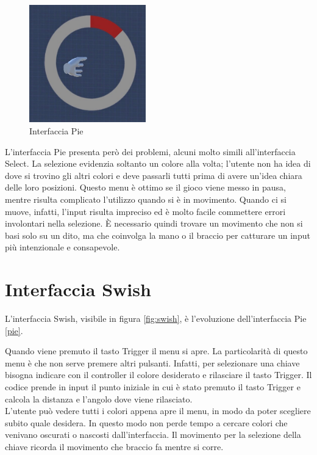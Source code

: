 \documentclass[target=bach,aauheader=]{thud}
\begin{document}
\begin{figure}[h]
    \centering
    \includegraphics[width=0.45\textwidth]{pie}
    \caption{Interfaccia Pie}
    \label{fig:pie}
\end{figure}

L'interfaccia Pie presenta però dei problemi, alcuni molto simili all'interfaccia Select.
La selezione evidenzia soltanto un colore alla volta; l'utente non ha idea di dove si trovino gli altri colori e deve passarli tutti prima di avere un'idea chiara delle loro posizioni.  
Questo menu è ottimo se il gioco viene messo in pausa, mentre risulta complicato l'utilizzo quando si è in movimento.
Quando ci si muove, infatti, l'input risulta impreciso ed è molto facile commettere errori involontari nella selezione.
È necessario quindi trovare un movimento che non si basi solo su un dito, ma che coinvolga la mano o il braccio per catturare un input più intenzionale e consapevole.

\section{Interfaccia Swish} %
\label{swish}
L'interfaccia Swish, visibile in figura \ref{fig:swish}, è l'evoluzione dell'interfaccia Pie \ref{pie}.

Quando viene premuto il tasto Trigger il menu si apre.
La particolarità di questo menu è che non serve premere altri pulsanti.
Infatti, per selezionare una chiave bisogna indicare con il controller il colore desiderato e rilasciare il tasto Trigger.
Il codice prende in input il punto iniziale in cui è stato premuto il tasto Trigger e calcola la distanza e l'angolo dove viene rilasciato. \\

L'utente può vedere tutti i colori appena apre il menu, in modo da poter scegliere subito quale desidera.
In questo modo non perde tempo a cercare colori che venivano oscurati o nascosti dall'interfaccia.
Il movimento per la selezione della chiave ricorda il movimento che braccio fa mentre si corre.
\end{document}
